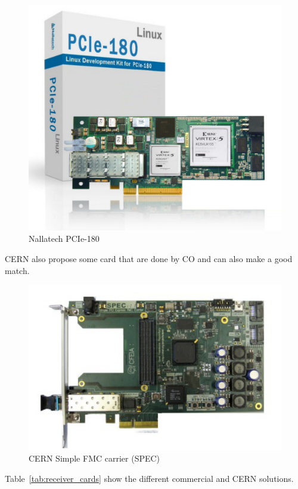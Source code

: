 \begin{figure}[H]
\caption{Nallatech PCIe-180}
\label{fig:nallatech}
\centering
\includegraphics[scale=0.3]{Nallatech_PCIe-180.pdf}
\end{figure}

\gls{CERN} also propose some card that are done by \gls{CO} and can also make a good match.

\begin{figure}[H]
\caption{CERN Simple FMC carrier (SPEC)}
\label{fig:spec}
\centering
\includegraphics[scale=0.3]{spec_top.pdf}
\end{figure}

Table~\ref{tab:receiver_cards} show the different commercial and CERN solutions.

